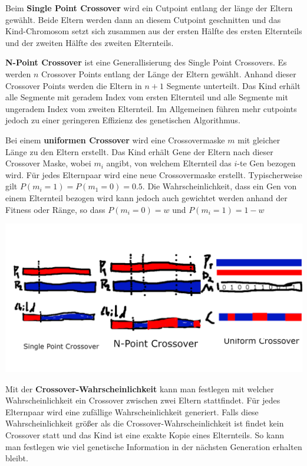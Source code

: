 Beim \textbf{Single Point Crossover} wird ein Cutpoint entlang der länge der Eltern gewählt. Beide Eltern werden dann an diesem Cutpoint geschnitten und das Kind-Chromosom setzt sich zusammen aus der ersten Hälfte des ersten Elternteils und der zweiten Hälfte des zweiten Elternteils.

\textbf{N-Point Crossover} ist eine Generallisierung des Single Point Crossovers. Es werden $n$ Crossover Points entlang der Länge der Eltern gewählt. Anhand dieser Crossover Points werden die Eltern in $n+1$ Segmente unterteilt. Das Kind erhält alle Segmente mit geradem Index vom ersten Elternteil und alle Segmente mit ungeradem Index vom zweiten Elternteil. Im Allgemeinen führen mehr cutpoints jedoch zu einer geringeren Effizienz  des genetischen Algorithmus.~\cite*{TerminologiesAndOperators}

Bei einem \textbf{uniformen Crossover} wird eine Crossovermaske $m$ mit gleicher Länge zu den Eltern erstellt. Das Kind erhält Gene der Eltern nach dieser Crossover Maske, wobei $m_i$ angibt, von welchem Elternteil das $i$-te Gen bezogen wird. Für jedes Elternpaar wird eine neue Crossovermaske erstellt. Typischerweise gilt $P(m_i = 1) = P(m_1 = 0) = 0.5$. Die Wahrscheinlichkeit, dass ein Gen von einem Elternteil bezogen wird kann jedoch auch gewichtet werden anhand der Fitness oder Ränge, so dass $P(m_i = 0) = w$ und $P(m_i = 1) = 1 - w$

\includegraphics[scale=1.0]{images/Crossover_Methods.png}

Mit der \textbf{Crossover-Wahrscheinlichkeit} kann man festlegen mit welcher Wahrscheinlichkeit ein Crossover zwischen zwei Eltern stattfindet. Für jedes Elternpaar wird eine zufällige Wahrscheinlichkeit generiert. Falls diese Wahrscheinlichkeit größer als die Crossover-Wahrscheinlichkeit ist findet kein Crossover statt und das Kind ist eine exakte Kopie eines Elternteils. So kann man festlegen wie viel genetische Information in der nächsten Generation erhalten bleibt.

